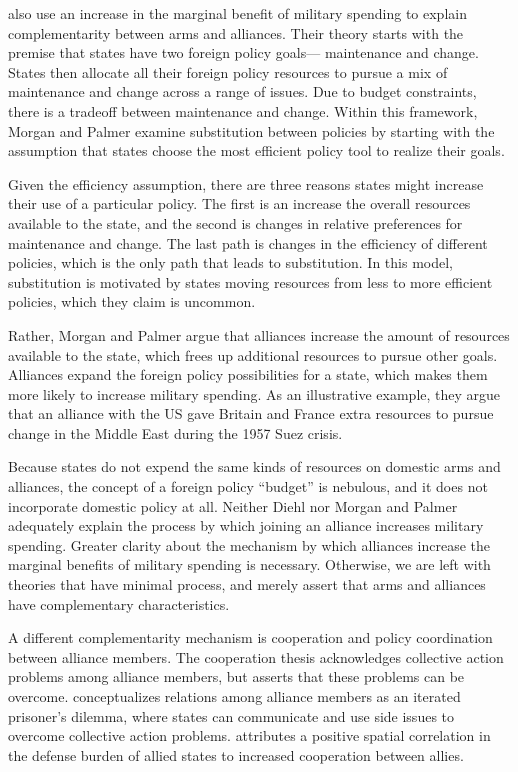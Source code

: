 \documentclass[12pt]{article}
\begin{document}
\citet{MorganPalmer2006} also use an increase in the marginal benefit of military spending to explain complementarity between arms and alliances. Their theory starts with the premise that states have two foreign policy goals--- maintenance and change. States then allocate all their foreign policy resources to pursue a mix of maintenance and change across a range of issues. Due to budget constraints, there is a tradeoff between maintenance and change. Within this framework, Morgan and Palmer examine substitution between policies by starting with the assumption that states choose the most efficient policy tool to realize their goals. 

Given the efficiency assumption, there are three reasons states might increase their use of a particular policy. The first is an increase the overall resources available to the state, and the second is changes in relative preferences for maintenance and change. The last path is changes in the efficiency of different policies, which is the only path that leads to substitution. In this model, substitution is motivated by states moving resources from less to more efficient policies, which they claim is uncommon. 

Rather, Morgan and Palmer argue that alliances increase the amount of resources available to the state, which frees up additional resources to pursue other goals. Alliances expand the foreign policy possibilities for a state, which makes them more likely to increase military spending. As an illustrative example, they argue that an alliance with the US gave Britain and France extra resources to pursue change in the Middle East during the 1957 Suez crisis.  

Because states do not expend the same kinds of resources on domestic arms and alliances, the concept of a foreign policy ``budget'' is nebulous, and it does not incorporate domestic policy at all. Neither Diehl nor Morgan and Palmer adequately explain the process by which joining an alliance increases military spending. Greater clarity about the mechanism by which alliances increase the marginal benefits of military spending is necessary. Otherwise, we are left with theories that have minimal process, and merely assert that arms and alliances have complementary characteristics. 

A different complementarity mechanism is cooperation and policy coordination between alliance members. The cooperation thesis acknowledges collective action problems among alliance members, but asserts that these problems can be overcome. \citet{Palmer1990} conceptualizes relations among alliance members as an iterated prisoner's dilemma, where states can communicate and use side issues to overcome collective action problems. \citet{QuirozFlores2011} attributes a positive spatial correlation in the defense burden of allied states to increased cooperation between allies. 
\end{document}
